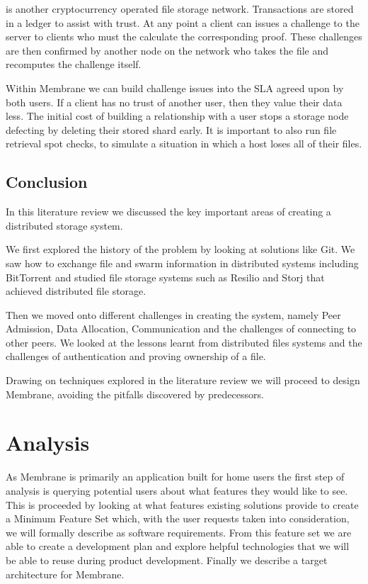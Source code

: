 \documentclass[a4paper, 11pt, twocolumn, twoside]{report}
\begin{document}
\cite{filecoin2014filecoin} is another cryptocurrency operated file storage network. Transactions are stored in a ledger to assist with trust. At any point a client can issues a challenge to the server to clients who must the calculate the corresponding proof. These challenges are then confirmed by another node on the network who takes the file and recomputes the challenge itself.

Within Membrane we can build challenge issues into the SLA agreed upon by both users. If a client has no trust of another user, then they value their data less. The initial cost of building a relationship with a user stops a storage node defecting by deleting their stored shard early. It is important to also run file retrieval spot checks, to simulate a situation in which a host loses all of their files.

\section{Conclusion}
In this literature review we discussed the key important areas of creating a distributed storage system.

We first explored the history of the problem by looking at solutions like Git. We saw how to exchange file and swarm information in distributed systems including BitTorrent and studied file storage systems such as Resilio and Storj that achieved distributed file storage.

Then we moved onto different challenges in creating the system, namely Peer Admission, Data Allocation, Communication and the challenges of connecting to other peers. We looked at the lessons learnt from distributed files systems and the challenges of authentication and proving ownership of a file.

Drawing on techniques explored in the literature review we will proceed to design Membrane, avoiding the pitfalls discovered by predecessors.

\chapter{Analysis}

As Membrane is primarily an application built for home users the first step of analysis is querying potential users about what features they would like to see. This is proceeded by looking at what features existing solutions provide to create a Minimum Feature Set which, with the user requests taken into consideration, we will formally describe as software requirements. From this feature set we are able to create a development plan and explore helpful technologies that we will be able to reuse during product development. Finally we describe a target architecture for Membrane.
\end{document}
